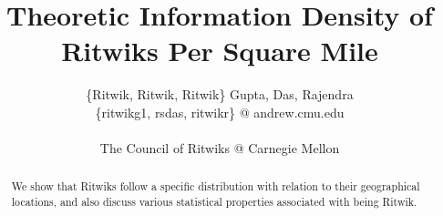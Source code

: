 \documentclass[]{article}
\title{Theoretic Information Density of Ritwiks Per Square Mile}
\author{\{Ritwik, Ritwik, Ritwik\} Gupta, Das, Rajendra
	\\
	\{ritwikg1, rsdas, ritwikr\} @ andrew.cmu.edu
	\\
	\\
	The Council of Ritwiks @ Carnegie Mellon}
\date{}
\begin{document}
\maketitle

\begin{abstract}
We show that Ritwiks follow a specific distribution with relation to their geographical locations, and also discuss various statistical properties associated with being Ritwik.
\end{abstract}

\section{}
\end{document}
